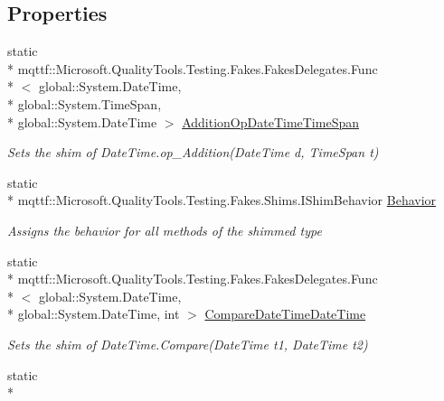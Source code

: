 \subsection*{Properties}
\begin{DoxyCompactItemize}
\item 
static \\*
mqttf\-::\-Microsoft.\-Quality\-Tools.\-Testing.\-Fakes.\-Fakes\-Delegates.\-Func\\*
$<$ global\-::\-System.\-Date\-Time, \\*
global\-::\-System.\-Time\-Span, \\*
global\-::\-System.\-Date\-Time $>$ \hyperlink{class_system_1_1_fakes_1_1_shim_date_time_a9def4e2d5592498d706fdfe3a7666f74}{Addition\-Op\-Date\-Time\-Time\-Span}
\begin{DoxyCompactList}\small\item\em Sets the shim of Date\-Time.\-op\-\_\-\-Addition(\-Date\-Time d, Time\-Span t)\end{DoxyCompactList}\item 
static \\*
mqttf\-::\-Microsoft.\-Quality\-Tools.\-Testing.\-Fakes.\-Shims.\-I\-Shim\-Behavior \hyperlink{class_system_1_1_fakes_1_1_shim_date_time_ac8d7cde7ba6c80ba03f7882e021a540c}{Behavior}
\begin{DoxyCompactList}\small\item\em Assigns the behavior for all methods of the shimmed type\end{DoxyCompactList}\item 
static \\*
mqttf\-::\-Microsoft.\-Quality\-Tools.\-Testing.\-Fakes.\-Fakes\-Delegates.\-Func\\*
$<$ global\-::\-System.\-Date\-Time, \\*
global\-::\-System.\-Date\-Time, int $>$ \hyperlink{class_system_1_1_fakes_1_1_shim_date_time_a1381e1c06d3859965be1574c6a1351aa}{Compare\-Date\-Time\-Date\-Time}
\begin{DoxyCompactList}\small\item\em Sets the shim of Date\-Time.\-Compare(\-Date\-Time t1, Date\-Time t2)\end{DoxyCompactList}\item 
static \\*

\end{DoxyCompactItemize}
